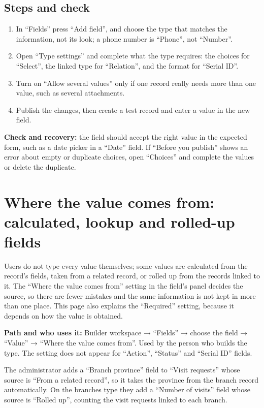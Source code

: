 \subsection{Steps and check}
\begin{enumerate}
\item In “Fields” press “Add field”, and choose the type that matches the information, not its look; a phone number is “Phone”, not “Number”.
\item Open “Type settings” and complete what the type requires: the choices for “Select”, the linked type for “Relation”, and the format for “Serial ID”.
\item Turn on “Allow several values” only if one record really needs more than one value, such as several attachments.
\item Publish the changes, then create a test record and enter a value in the new field.
\end{enumerate}

\textbf{Check and recovery:} the field should accept the right value in the expected form, such as a date picker in a “Date” field. If “Before you publish” shows an error about empty or duplicate choices, open “Choices” and complete the values or delete the duplicate.

\clearpage
\section{Where the value comes from: calculated, lookup and rolled-up fields}
\label{sec:builder-feature-field-values}

Users do not type every value themselves; some values are calculated from the record's fields, taken from a related record, or rolled up from the records linked to it. The “Where the value comes from” setting in the field's panel decides the source, so there are fewer mistakes and the same information is not kept in more than one place. This page also explains the “Required” setting, because it depends on how the value is obtained.

\textbf{Path and who uses it:} Builder workspace → “Fields” → choose the field → “Value” → “Where the value comes from”. Used by the person who builds the type. The setting does not appear for “Action”, “Status” and “Serial ID” fields.

\begin{rcnote}
The administrator adds a “Branch province” field to “Visit requests” whose source is “From a related record”, so it takes the province from the branch record automatically. On the branches type they add a “Number of visits” field whose source is “Rolled up”, counting the visit requests linked to each branch.
\end{rcnote}

